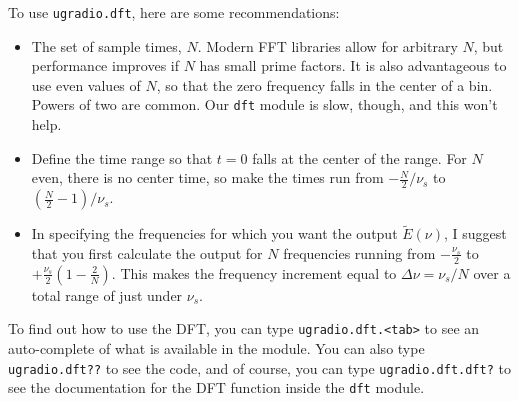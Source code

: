 \documentclass[11pt,preprint]{aastex}
\begin{document}
To use \verb$ugradio.dft$, here are some recommendations:
\begin{itemize}

\item The set of sample times, $N$. Modern FFT libraries allow for arbitrary $N$, but performance improves
if $N$ has small prime factors. 
It is also advantageous to use even values of $N$, so that the zero frequency falls in the center of a bin.
Powers of two are common. 
Our \verb$dft$ module is slow, though, and this won't help. 

\item Define the time range so that $t=0$ falls at the center of the range.
  For $N$ even, there is no center time, so make the times
  run from $-\frac{N}{2}/ \nu_s$ to $(\frac{N}{2} -1)/ \nu_s$.

\item 
  In specifying the frequencies for which you want the output $\tilde E(\nu)$, I 
  suggest that you first calculate the output for $N$
  frequencies running from $-\frac{\nu_s}{2}$ to $+\frac{\nu_s}{2}\left(1 - \frac{2}{N} \right)$. 
This makes the frequency
  increment equal to $\Delta \nu = \nu_s/N$ over a total range of
  just under $\nu_s$.

\end{itemize}

To find out how to use the DFT, you can type {\tt ugradio.dft.<tab>} to see an
auto-complete of what is available in the module.  You can also type {\tt ugradio.dft??} to see
the code, and of course, you can type {\tt ugradio.dft.dft?} to see the documentation for
the DFT function inside the {\tt dft} module.
\end{document}
